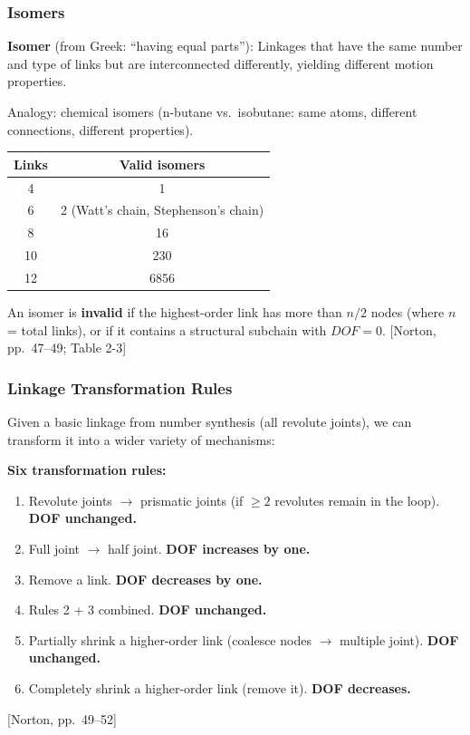 \documentclass[10pt,aspectratio=43]{beamer}
\newcommand{\pref}[1]{\vfill\hfill{\scriptsize\color{gray}[Norton, pp.~#1]}}
\begin{document}
\begin{frame}
\frametitle{Isomers}

\begin{yellowbox}
\textbf{Isomer} (from Greek: ``having equal parts''): Linkages that have the same number and type of links but are interconnected differently, yielding different motion properties.
\end{yellowbox}

\vspace{4pt}
Analogy: chemical isomers (n-butane vs.\ isobutane: same atoms, different connections, different properties).

\vspace{6pt}
\begin{center}
\small
\begin{tabular}{c|c}
\toprule
\textbf{Links} & \textbf{Valid isomers} \\
\midrule
4 & 1 \\
6 & 2 (Watt's chain, Stephenson's chain) \\
8 & 16 \\
10 & 230 \\
12 & 6856 \\
\bottomrule
\end{tabular}
\end{center}

\vspace{4pt}
An isomer is \textbf{invalid} if the highest-order link has more than $n/2$ nodes (where $n$ = total links), or if it contains a structural subchain with $DOF = 0$.
\pref{47--49; Table 2-3}
\end{frame}


\begin{frame}
\frametitle{Linkage Transformation Rules}

Given a basic linkage from number synthesis (all revolute joints), we can transform it into a wider variety of mechanisms:

\begin{yellowbox}
\textbf{Six transformation rules:}
\begin{enumerate}
  \item Revolute joints $\to$ prismatic joints (if $\geq 2$ revolutes remain in the loop). \textbf{DOF unchanged.}
  \item Full joint $\to$ half joint. \textbf{DOF increases by one.}
  \item Remove a link. \textbf{DOF decreases by one.}
  \item Rules 2 + 3 combined. \textbf{DOF unchanged.}
  \item Partially shrink a higher-order link (coalesce nodes $\to$ multiple joint). \textbf{DOF unchanged.}
  \item Completely shrink a higher-order link (remove it). \textbf{DOF decreases.}
\end{enumerate}
\end{yellowbox}
\pref{49--52}
\end{frame}
\end{document}
